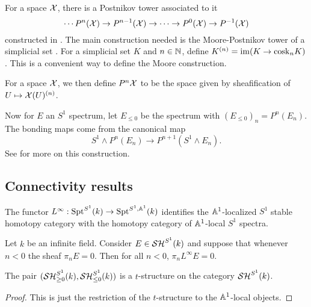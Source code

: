 \documentclass{amsart}%
\newcommand{\cosk}{\mathrm{cosk}}
\begin{document}
\begin{remark}
  For a space $\mathcal{X}$, there is a Postnikov tower associated to it
  \begin{equation*}
    \cdots P^n(\mathcal{X})\to P^{n-1}(\mathcal{X}) \to \cdots \to P^{0}(\mathcal{X}) \to P^{-1}(\mathcal{X})
  \end{equation*}
  constructed in \cite[p. 57]{MV99}. The main construction needed is the
  Moore-Postnikov tower of a simplicial set \cite[VI.3.4]{GJ91}. For a
  simplicial set $K$ and $n\in\mathbb{N}$, define
  $K^{(n)} = \im ( K \to \cosk_nK)$. This is a convenient way to
  define the Moore construction. 

  For a space $\mathcal{X}$, we then define $P^{n}\mathcal{X}$ to be the space
  given by sheafification of $U \mapsto \mathcal{X}(U)^{(n)}$.

  Now for $E$ an $S^1$ spectrum, let $E_{\leq 0}$ be the spectrum with
  $(E_{\leq 0})_n = P^n(E_n)$. The bonding maps come from the
  canonical map
  \begin{equation*}
    S^1 \wedge P^n(E_n) \to P^{n+1}(S^1 \wedge E_n).
  \end{equation*}
  See \cite[Lemma 3.2.1]{Mor05} for more on this construction.
\end{remark}

\subsection{Connectivity results}

\begin{proposition}\cite[Lemma4.2.4]{Mor03}
  The functor
  $L^{\infty} : \mathrm{Spt}^{S^1}(k) \to \mathrm{Spt}^{S^1,\mathbb{A}^1}(k)$
  identifies the $\mathbb{A}^1$-localized $S^1$ stable homotopy category
  with the homotopy category of $\mathbb{A}^1$-local $S^1$ spectra.
\end{proposition}

\begin{theorem}
  Let $k$ be an infinite field. Consider $E \in \mathcal{SH}^{S^1}(k)$ and
  suppose that whenever $n < 0$ the sheaf $\pi_n E = 0$. Then for all
  $n<0$, $\pi_n L^{\infty}E = 0$.
\end{theorem}

\begin{theorem}
  The pair $(\mathcal{SH}_{\geq 0}^{S^1}(k), \mathcal{SH}_{\leq 0}^{S^1}(k))$ is a
  $t$-structure on the category $\mathcal{SH}^{S^1}(k)$. 
\end{theorem}

\begin{proof}
  This is just the restriction of the $t$-structure to the
  $\mathbb{A}^1$-local objects.
\end{proof}
\end{document}
